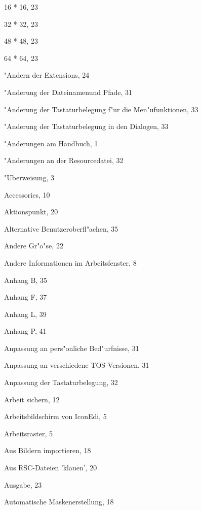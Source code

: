 \ifx\bilder\undefined
\begin{theindex}

  \item 16 * 16, 23
  \item 32 * 32, 23
  \item 48 * 48, 23
  \item 64 * 64, 23

  \indexspace

  \item "Andern der Extensions, 24
  \item "Anderung der Dateinamenund Pfade, 31
  \item "Anderung der Tastaturbelegung f"ur die Men"ufunktionen, 33
  \item "Anderung der Tastaturbelegung in den Dialogen, 33
  \item "Anderungen am Handbuch, 1
  \item "Anderungen an der Resourcedatei, 32

  \indexspace

  \item "Uberweisung, 3

  \indexspace

  \item Accessories, 10
  \item Aktionspunkt, 20
  \item Alternative Benutzeroberfl"achen, 35
  \item Andere Gr"o"se, 22
  \item Andere Informationen im Arbeitsfenster, 8
  \item Anhang B, 35
  \item Anhang F, 37
  \item Anhang L, 39
  \item Anhang P, 41
  \item Anpassung an pers"onliche Bed"urfnisse, 31
  \item Anpassung an verschiedene TOS-Versionen, 31
  \item Anpassung der Tastaturbelegung, 32
  \item Arbeit sichern, 12
  \item Arbeitsbildschirm von IconEdi, 5
  \item Arbeitsraster, 5
  \item Aus Bildern importieren, 18
  \item Aus RSC-Dateien 'klauen', 20
  \item Ausgabe, 23
  \item Automatische Maskenerstellung, 18


\end{theindex}

